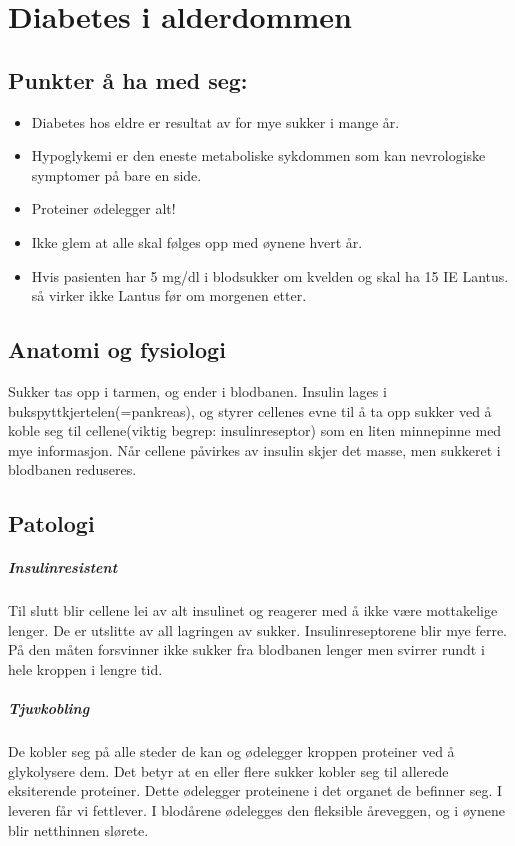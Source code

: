 	\chapter{Diabetes i alderdommen}%
		\section{Punkter å ha med seg:}
			\begin{itemize}
				\item Diabetes hos eldre er resultat av for mye sukker i mange år.\\
				\item Hypoglykemi er den eneste metaboliske sykdommen som kan nevrologiske symptomer på bare en side.\\
				\item Proteiner ødelegger alt!\\
				\item Ikke glem at alle skal følges opp med øynene hvert år.\\
				\item Hvis pasienten har 5 mg/dl i blodsukker om kvelden og skal ha 15 IE Lantus\textregistered. så virker ikke Lantus før om morgenen etter.\\
			\end{itemize}
		\section{Anatomi og fysiologi}
			Sukker tas opp i tarmen, og ender i blodbanen. Insulin lages i bukspyttkjertelen(=pankreas), og styrer cellenes evne til å ta opp sukker ved å koble seg til cellene(viktig begrep: insulinreseptor) som en liten minnepinne med mye informasjon. Når cellene påvirkes av insulin skjer det masse, men sukkeret i blodbanen reduseres.
		\section{Patologi}
			\paragraph{Insulinresistent\\}
				Til slutt blir cellene lei av alt insulinet og reagerer med å ikke være mottakelige lenger. De er utslitte av all lagringen av sukker. Insulinreseptorene blir mye ferre. På den måten forsvinner ikke sukker fra blodbanen lenger men svirrer rundt i hele kroppen i lengre tid.
			\paragraph{Tjuvkobling\\}
				De kobler seg på alle steder de kan og ødelegger kroppen proteiner ved å glykolysere dem. Det betyr at en eller flere sukker kobler seg til allerede eksiterende proteiner. Dette ødelegger proteinene i det organet de befinner seg. I leveren får vi fettlever. I blodårene ødelegges den fleksible åreveggen, og i øynene blir netthinnen slørete.
